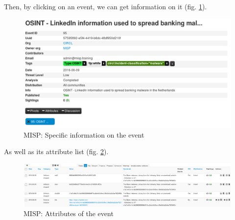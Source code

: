 \documentclass{eplmastersthesis}
\begin{document}
Then, by clicking on an event, we can get information on it (fig. \ref{webevent}).


\begin{figure}[!h]
	\begin{center}
		\includegraphics[scale=0.35]{res/webEvent}
		\caption{MISP: Specific information on the event}
		\label{webevent}
	\end{center}
\end{figure}


As well as its attribute list (fig. \ref{webattributes}).
\begin{figure}[!h]
	\begin{center}
		\includegraphics[scale=0.35]{res/webAttributes}
		\caption{MISP: Attributes of the event}
		\label{webattributes}
	\end{center}
\end{figure}
\end{document}
